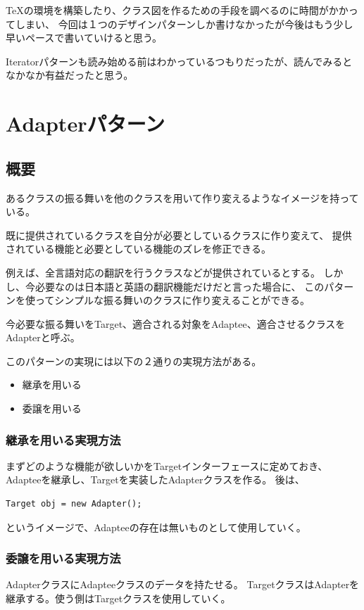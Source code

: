 \documentclass[11pt]{jsarticle}
\begin{document}
			\TeX の環境を構築したり、クラス図を作るための手段を調べるのに時間がかかってしまい、
			今回は１つのデザインパターンしか書けなかったが今後はもう少し早いペースで書いていけると思う。
			
			Iteratorパターンも読み始める前はわかっているつもりだったが、読んでみるとなかなか有益だったと思う。
			\clearpage
			
	\section{Adapterパターン}
		\subsection{概要}
			あるクラスの振る舞いを他のクラスを用いて作り変えるようなイメージを持っている。
			
			既に提供されているクラスを自分が必要としているクラスに作り変えて、
			提供されている機能と必要としている機能のズレを修正できる。
			
			例えば、全言語対応の翻訳を行うクラスなどが提供されているとする。
			しかし、今必要なのは日本語と英語の翻訳機能だけだと言った場合に、
			このパターンを使ってシンプルな振る舞いのクラスに作り変えることができる。
			
			今必要な振る舞いをTarget、適合される対象をAdaptee、適合させるクラスをAdapterと呼ぶ。
			
			このパターンの実現には以下の２通りの実現方法がある。
			\begin{itemize}
				\item{継承を用いる}
				\item{委譲を用いる}
			\end{itemize}
			
			\subsubsection{継承を用いる実現方法}
				まずどのような機能が欲しいかをTargetインターフェースに定めておき、
				Adapteeを継承し、Targetを実装したAdapterクラスを作る。
				後は、
				\begin{lstlisting}[basicstyle=\ttfamily\scriptsize, frame=single] 
Target obj = new Adapter();
				\end{lstlisting}
				というイメージで、Adapteeの存在は無いものとして使用していく。
				
			\subsubsection{委譲を用いる実現方法}\label{sec::adapter1}
				AdapterクラスにAdapteeクラスのデータを持たせる。
				TargetクラスはAdapterを継承する。使う側はTargetクラスを使用していく。
\end{document}
